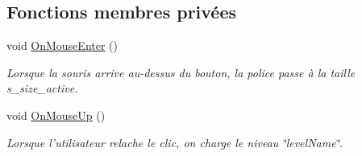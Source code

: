 \subsection*{Fonctions membres privées}
\begin{DoxyCompactItemize}
\item 
\hypertarget{class_adaptive_font_abd63837566c38d9a045957e794a2316c}{void \hyperlink{class_adaptive_font_abd63837566c38d9a045957e794a2316c}{On\+Mouse\+Enter} ()}\label{class_adaptive_font_abd63837566c38d9a045957e794a2316c}

\begin{DoxyCompactList}\small\item\em Lorsque la souris arrive au-\/dessus du bouton, la police passe à la taille s\+\_\+size\+\_\+active. \end{DoxyCompactList}\item 
\hypertarget{class_adaptive_font_a68b43aa442ad16678b8b12b8b1844b35}{void \hyperlink{class_adaptive_font_a68b43aa442ad16678b8b12b8b1844b35}{On\+Mouse\+Up} ()}\label{class_adaptive_font_a68b43aa442ad16678b8b12b8b1844b35}

\begin{DoxyCompactList}\small\item\em Lorsque l'utilisateur relache le clic, on charge le niveau \char`\"{}level\+Name\char`\"{}. \end{DoxyCompactList}\end{DoxyCompactItemize}
